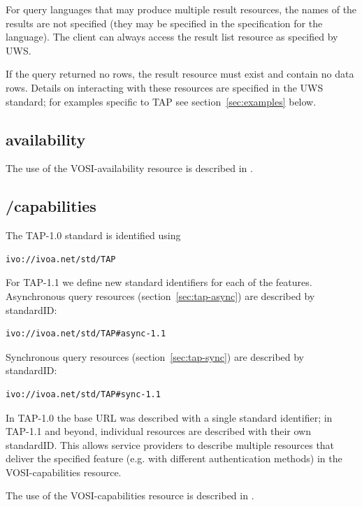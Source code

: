 \documentclass[11pt,letter]{ivoa}
\begin{document}
For query languages that may produce multiple result resources, the names of the 
results are not specified (they may be specified in the specification for the 
language). The client can always access the result list resource as specified by 
UWS.

If the query returned no rows, the result resource must exist and contain no 
data rows. Details on interacting with these resources are specified in the UWS 
standard; for examples specific to TAP see section~\ref{sec:examples} below.

\subsection{availability}
\label{sec:vosi-availability}

The use of the VOSI-availability resource is described in \citep{std:DALI}.

\subsection{/capabilities}
\label{sec:vosi-capabilities}

The TAP-1.0 standard is identified using 
\begin{verbatim}
ivo://ivoa.net/std/TAP
\end{verbatim}

For TAP-1.1 we define new standard identifiers for each of the 
features. Asynchronous query resources (section~\ref{sec:tap-async}) are described by standardID: 

\begin{verbatim}
ivo://ivoa.net/std/TAP#async-1.1 
\end{verbatim}

Synchronous query resources (section~\ref{sec:tap-sync}) are described by standardID:

\begin{verbatim}
ivo://ivoa.net/std/TAP#sync-1.1 
\end{verbatim}

In TAP-1.0 the base URL was described with a single standard identifier; in 
TAP-1.1 and beyond, individual resources are described with their own 
standardID. This allows service providers to describe multiple resources that 
deliver the specified feature (e.g. with different authentication methods) in 
the VOSI-capabilities resource.

The use of the VOSI-capabilities resource is described in \citep{std:DALI}.
\end{document}

